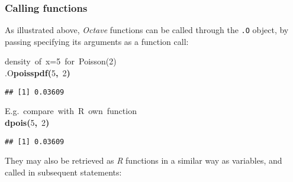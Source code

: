 \documentclass[english,10pt,a4paper]{article}\usepackage{graphicx, color}
\makeatletter
\newcommand{\hlnumber}[1]{\textcolor[rgb]{0,0,0}{#1}}%
\newcommand{\hlfunctioncall}[1]{\textcolor[rgb]{0.501960784313725,0,0.329411764705882}{\textbf{#1}}}%
\newcommand{\hlkeyword}[1]{\textcolor[rgb]{0,0,0}{\textbf{#1}}}%
\newcommand{\hlcomment}[1]{\textcolor[rgb]{0.180392156862745,0.6,0.341176470588235}{#1}}%
\newcommand{\hlsymbol}[1]{\textcolor[rgb]{0,0,0}{#1}}%
\newcommand{\hlstd}[1]{\textcolor[rgb]{0,0,0}{#1}}%
\newenvironment{kframe}{%
 \def\FrameCommand##1{\hskip\@totalleftmargin \hskip-\fboxsep
 \colorbox{shadecolor}{##1}\hskip-\fboxsep
     \hskip-\linewidth \hskip-\@totalleftmargin \hskip\columnwidth}%
 \MakeFramed {\advance\hsize-\width
   \@totalleftmargin\z@ \linewidth\hsize
   \@setminipage}}%
 {\par\unskip\endMakeFramed}
\newenvironment{knitrout}{}{} %
\let\proglang=\textit
\let\code=\texttt
\newcommand{\octave}{\proglang{Octave}\xspace}
\makeatother
\begin{document}
\subsubsection{Calling functions}
As illustrated above, \octave functions can be called through the
\code{.O} object, by passing specifying its arguments as a function call:
\begin{knitrout}
\color{fgcolor}\begin{kframe}
\begin{flushleft}
\ttfamily\noindent
\hlcomment{\usebox{\hlnormalsizeboxhash}{\ }density{\ }of{\ }x=5{\ }for{\ }Poisson(2)}\hspace*{\fill}\\
\hlstd{}\hlsymbol{.O}\hlkeyword{\usebox{\hlnormalsizeboxdollar}}\hlfunctioncall{poisspdf}\hlkeyword{(}\hlnumber{5}\hlkeyword{,}{\ }\hlnumber{2}\hlkeyword{)}\mbox{}
\normalfont
\end{flushleft}
\begin{verbatim}
## [1] 0.03609
\end{verbatim}
\begin{flushleft}
\ttfamily\noindent
\hlcomment{\usebox{\hlnormalsizeboxhash}{\ }E.g.{\ }compare{\ }with{\ }R{\ }own{\ }function}\hspace*{\fill}\\
\hlstd{}\hlfunctioncall{dpois}\hlkeyword{(}\hlnumber{5}\hlkeyword{,}{\ }\hlnumber{2}\hlkeyword{)}\mbox{}
\normalfont
\end{flushleft}
\begin{verbatim}
## [1] 0.03609
\end{verbatim}
\end{kframe}
\end{knitrout}


They may also be retrieved as \proglang{R} functions in a similar way as
variables, and called in subsequent statements:
\end{document}
